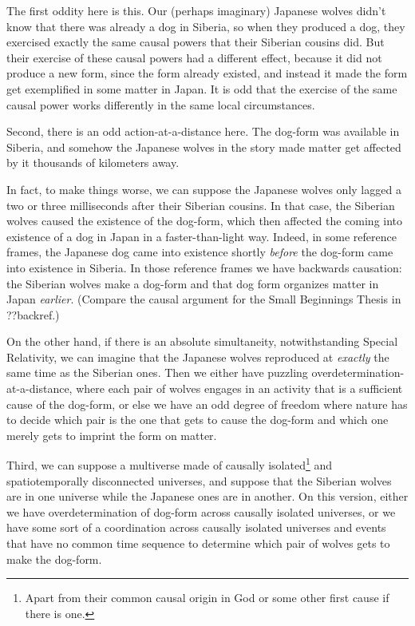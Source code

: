 The first oddity here is this. Our (perhaps imaginary) Japanese
wolves didn't know that there was already a dog in Siberia, so when they
produced a dog, they exercised exactly the same causal powers that their
Siberian cousins did. But their exercise of these causal powers had a
different effect, because it did not produce a new form, since the form
already existed, and instead it made the form get exemplified in some
matter in Japan. It is odd that the exercise of the same causal power
works differently in the same local circumstances.

Second, there is an odd action-at-a-distance here. The dog-form was
available in Siberia, and somehow the Japanese wolves in the story made
matter get affected by it thousands of kilometers away.

In fact, to make things worse, we can suppose the Japanese wolves
only lagged a two or three milliseconds after their Siberian cousins. In
that case, the Siberian wolves caused the existence of the dog-form,
which then affected the coming into existence of a dog in Japan in a
faster-than-light way. Indeed, in some reference frames, the Japanese
dog came into existence shortly \textit{before} the dog-form came into
existence in Siberia. In those reference frames we have backwards
causation: the Siberian wolves make a dog-form and that dog form
organizes matter in Japan \textit{earlier}. (Compare the causal argument
for the Small Beginnings Thesis in ??backref.)

On the other hand, if there is an absolute simultaneity, notwithstanding
Special Relativity, we can imagine that the Japanese wolves reproduced 
at \textit{exactly} the same time as the Siberian ones. Then we either
have puzzling overdetermination-at-a-distance, where each pair of wolves
engages in an activity that is a sufficient cause of the dog-form, or else
we have an odd degree of freedom where nature has to decide which pair is
the one that gets to cause the dog-form and which one merely gets to 
imprint the form on matter.

Third, we can suppose a multiverse made of causally isolated\footnote{Apart from
their common causal origin in God or some other first cause if there is
one.} and spatiotemporally disconnected universes, and suppose that the Siberian
wolves are in one universe while the Japanese ones are in another. On this version,
either we have overdetermination of dog-form across causally isolated universes, or we 
have some sort of a coordination across causally isolated universes and events that
have no common time sequence to determine which pair of wolves gets to make the
dog-form. 

